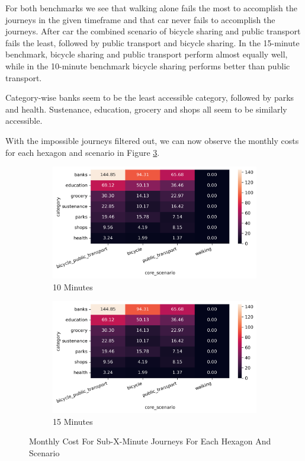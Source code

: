 For both benchmarks we see that walking alone fails the most to accomplish the journeys in the given timeframe and that car never fails to accomplish the journeys.
After car the combined scenario of bicycle sharing and public transport fails the least, followed by public transport and bicycle sharing.
In the 15-minute benchmark, bicycle sharing and public transport perform almost equally well, while in the 10-minute benchmark bicycle sharing performs better than public transport.

Category-wise banks seem to be the least accessible category, followed by parks and health.
Sustenance, education, grocery and shops all seem to be similarly accessible.

With the impossible journeys filtered out, we can now observe the monthly costs for each hexagon and scenario in Figure \ref{fig:costs_sub_x}.

\begin{figure}
  \centering
  \begin{subfigure}[b]{0.45\textwidth}
    \centering
    \includegraphics[width=\textwidth]{Figures/results/monthly_costs/cost_sub_10.png}
    \caption{10 Minutes}
    \label{fig:costs_sub_10}
  \end{subfigure}
  \hfill
  \begin{subfigure}[b]{0.45\textwidth}
    \centering
    \includegraphics[width=\textwidth]{Figures/results/monthly_costs/cost_sub_10.png}
    \caption{15 Minutes}
    \label{fig:costs_sub_15}
  \end{subfigure}
  \caption{Monthly Cost For Sub-X-Minute Journeys For Each Hexagon And Scenario}
  \label{fig:costs_sub_x}
\end{figure}

